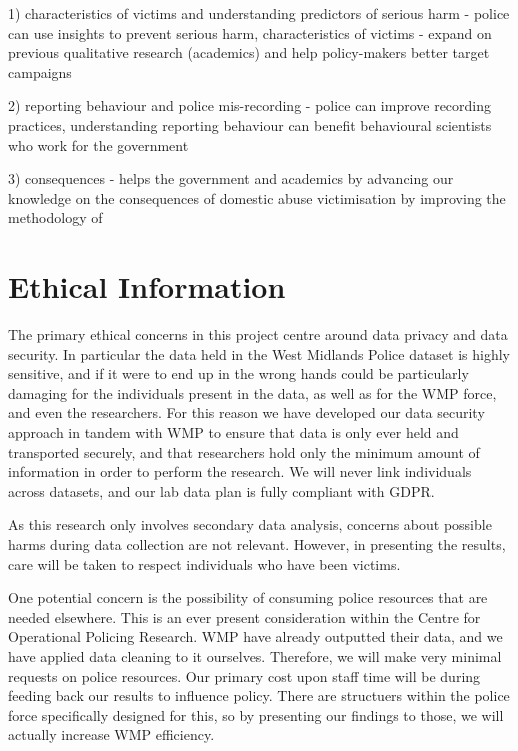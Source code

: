 \documentclass[11pt, a4paper]{article}
\begin{document}
1) characteristics of victims and understanding predictors of serious harm - police can use insights to prevent serious harm, characteristics of victims - expand on previous qualitative research (academics) and help policy-makers better target campaigns

2) reporting behaviour and police mis-recording - police can improve recording practices, understanding reporting behaviour can benefit behavioural scientists who work for the government

3) consequences - helps the government and academics by advancing our knowledge on the consequences of domestic abuse victimisation by improving the methodology of
  
  
  

\section{Ethical Information}

The primary ethical concerns in this project centre around data privacy and data security. In particular the data held in the West Midlands Police dataset is highly sensitive, and if it were to end up in the wrong hands could be particularly damaging for the individuals present in the data, as well as for the WMP force, and even the researchers. For this reason we have developed our data security approach in tandem with WMP to ensure that data is only ever held and transported securely, and that researchers hold only the minimum amount of information in order to perform the research. We will never link individuals across datasets, and our lab data plan is fully compliant with GDPR.

As this research only involves secondary data analysis, concerns about possible harms during data collection are not relevant. However, in presenting the results, care will be taken to respect individuals who have been victims.

One potential concern is the possibility of consuming police resources that are needed elsewhere. This is an ever present consideration within the Centre for Operational Policing Research. WMP have already outputted their data, and we have applied data cleaning to it ourselves. Therefore, we will make very minimal requests on police resources. Our primary cost upon staff time will be during feeding back our results to influence policy. There are structuers within the police force specifically designed for this, so by presenting our findings to those, we will actually increase WMP efficiency.
\end{document}
